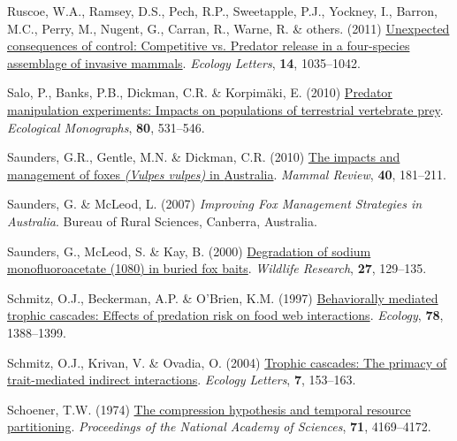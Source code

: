 \documentclass[11pt,a4paper,titlepage,twoside,openright]{style/unimelbthesis}
\newenvironment{CSLReferences}%
  {}%
  {\par}
\begin{document}
\begin{mainmatter}
\begin{CSLReferences}{1}{0}
\leavevmode{}%
Ruscoe, W.A., Ramsey, D.S., Pech, R.P., Sweetapple, P.J., Yockney, I., Barron, M.C., Perry, M., Nugent, G., Carran, R., Warne, R. \& others. (2011) \href{https://doi.org/10.1111/j.1461-0248.2011.01673.x}{Unexpected consequences of control: Competitive vs. Predator release in a four-species assemblage of invasive mammals}. \emph{Ecology Letters}, \textbf{14}, 1035--1042.

\leavevmode{}%
Salo, P., Banks, P.B., Dickman, C.R. \& Korpimäki, E. (2010) \href{https://doi.org/10.1890/09-1260.1}{Predator manipulation experiments: Impacts on populations of terrestrial vertebrate prey}. \emph{Ecological Monographs}, \textbf{80}, 531--546.

\leavevmode{}%
Saunders, G.R., Gentle, M.N. \& Dickman, C.R. (2010) \href{https://doi.org/10.1111/j.1365-2907.2010.00159.x}{The impacts and management of foxes \emph{({Vulpes vulpes})} in {A}ustralia}. \emph{Mammal Review}, \textbf{40}, 181--211.

\leavevmode{}%
Saunders, G. \& McLeod, L. (2007) \emph{Improving Fox Management Strategies in {A}ustralia}. Bureau of Rural Sciences, Canberra, Australia.

\leavevmode{}%
Saunders, G., McLeod, S. \& Kay, B. (2000) \href{https://doi.org/10.1071/WR99031}{Degradation of sodium monofluoroacetate (1080) in buried fox baits}. \emph{Wildlife Research}, \textbf{27}, 129--135.

\leavevmode{}%
Schmitz, O.J., Beckerman, A.P. \& O'Brien, K.M. (1997) \href{https://doi.org/10.1890/0012-9658(1997)078\%5B1388:BMTCEO\%5D2.0.CO;2}{Behaviorally mediated trophic cascades: Effects of predation risk on food web interactions}. \emph{Ecology}, \textbf{78}, 1388--1399.

\leavevmode{}%
Schmitz, O.J., Krivan, V. \& Ovadia, O. (2004) \href{https://doi.org/10.1111/j.1461-0248.2003.00560.x}{Trophic cascades: The primacy of trait-mediated indirect interactions}. \emph{Ecology Letters}, \textbf{7}, 153--163.

\leavevmode{}%
Schoener, T.W. (1974) \href{https://doi.org/10.1073/pnas.71.10.4169}{The compression hypothesis and temporal resource partitioning}. \emph{Proceedings of the National Academy of Sciences}, \textbf{71}, 4169--4172.


\end{CSLReferences}
\end{mainmatter}
\end{document}
